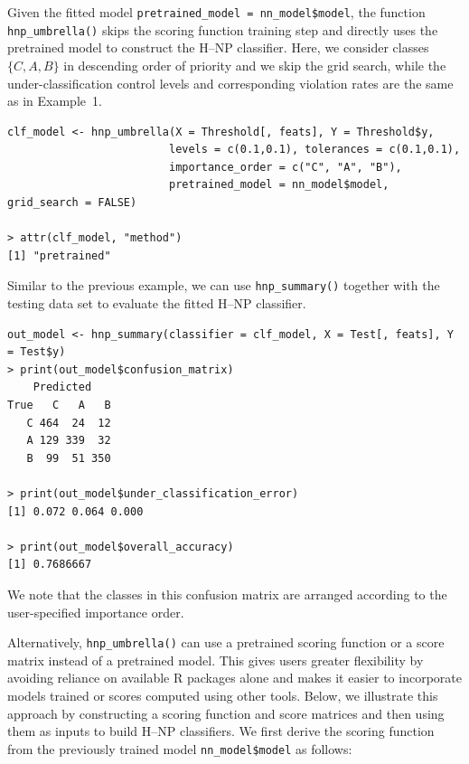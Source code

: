 Given the fitted model \texttt{pretrained\_model = nn\_model\$model}, the function \texttt{hnp\_umbrella()} skips the scoring function  training step and directly uses the pretrained model to construct the H--NP classifier. Here, we consider classes \(\{C, A, B\}\) in descending order of priority and we skip the grid search, while the under-classification control levels and corresponding violation rates are the same as in Example~1.

\begin{verbatim} 
clf_model <- hnp_umbrella(X = Threshold[, feats], Y = Threshold$y, 
                         levels = c(0.1,0.1), tolerances = c(0.1,0.1), 
                         importance_order = c("C", "A", "B"),
                         pretrained_model = nn_model$model,  grid_search = FALSE)

> attr(clf_model, "method") 
[1] "pretrained"
\end{verbatim}
Similar to the previous example, we can use \texttt{hnp\_summary()} together with the testing data set to evaluate the fitted H--NP classifier.
\begin{verbatim} 
out_model <- hnp_summary(classifier = clf_model, X = Test[, feats], Y = Test$y)
> print(out_model$confusion_matrix)
    Predicted
True   C   A   B
   C 464  24  12
   A 129 339  32
   B  99  51 350
        
> print(out_model$under_classification_error)
[1] 0.072 0.064 0.000

> print(out_model$overall_accuracy)
[1] 0.7686667
\end{verbatim}
We note that the classes in this confusion matrix are arranged according to the user-specified importance order.

Alternatively, \texttt{hnp\_umbrella()} can use a pretrained scoring function or a score matrix instead of a pretrained model. This gives users greater flexibility by avoiding reliance on available R packages alone and makes it easier to incorporate models trained or scores computed using other tools. Below, we illustrate this approach by constructing a scoring function and score matrices and then using them as inputs to build H--NP classifiers. We first derive the scoring function from the previously trained model \texttt{nn\_model\$model} as follows:


